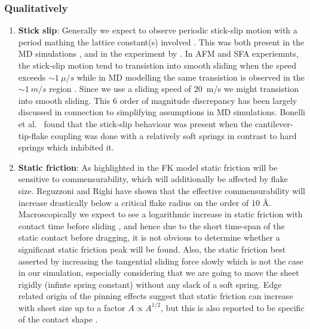 \subsubsection{Qualitatively}
\begin{enumerate}
  \item \textbf{Stick slip}: Generally we expect to observe periodic stick-slip motion with a period mathing the lattice constant(s) involved \cite{mo_friction_2009}. This was both present in the MD simulations \cite{zhu_study_2018}, \cite{ma12091425} and in the experiment by \cite{DIENWIEBEL2005197}. In AFM and SFA experiemnts, the stick-slip motion tend to transistion into smooth sliding when the speed exceeds $\sim \SI{1}{\mu/s}$ while in MD modelling the same transistion is observed in the $\sim \SI{1}{m/s}$ region \cite{Manini_2016}. Since we use a sliding speed of \SI{20}{m/s} we might transistion into smooth sliding. This 6 order of magnitude discrepancy has been largely discussed in connection to simplifying assumptions in MD simulations. Bonelli et al.\ \cite{bonelli_atomistic_2009} found that the stick-slip behaviour was present when the cantilever-tip-flake coupling was done with a relatively soft springs in contrast to hard springs which inhibited it.   

  \item \textbf{Static friction}: As highlighted in the FK model static friction
  will be sensitive to commensurability, which will additionally be affected by
  flake size. Reguzzoni and Righi \cite{PhysRevB.85.201412} have shown that the
  effective commensurability will increase drastically below a critical flake
  radius on the order of $10$ Å. Macroscopically we expect to see a logarithmic
  increase in static friction with contact time before sliding
  \cite{dieterich_1972}, and hence due to the short time-span of the static
  contact before dragging, it is not obvious to determine whether a significant
  static friction peak will be found. Also, the static friction best asserted by
  increasing the tangential sliding force slowly which is not the case in our
  simulation, especially considering that we are going to move the sheet rigidly
  (infinte spring constant) without any slack of a soft spring. Edge related
  origin of the pinning effects suggest that static friction can increase with
  sheet size up to a factor $A\propto A^{1/2}$, but this is also reported to be specific of the contact shape \cite{Manini_2016}.
  




\end{enumerate}

